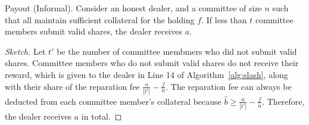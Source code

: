 \begin{theorem}{Payout (Informal).}
    Consider an honest dealer, and a committee of size $n$ such that all maintain sufficient collateral for the holding $f$.
    If less than $t$ committee members submit valid shares, the dealer receives $a$.
\end{theorem}
\begin{proof}[Sketch]
    Let $t'$ be the number of committee membmers who did not submit valid shares.
    Committee members who do not submit valid shares do not receive their reward, which is given to the dealer in Line 14 of Algorithm~\ref{alg:slash}, along with their share of the reparation fee $\frac{a}{|t'|} - \frac{f}{n}$.
    The reparation fee can always be deducted from each committee member's collateral because $\hat{b} \geq \frac{a}{|t'|} - \frac{f}{n}$.
    Therefore, the dealer receives $a$ in total.
\end{proof}